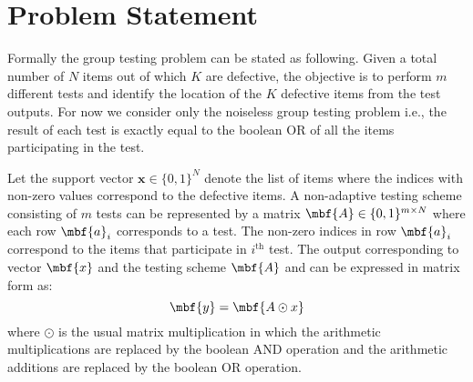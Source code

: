 \documentclass[conference,,twocolumn]{IEEEtran}
\begin{document}

\section{Problem Statement}
Formally the group testing problem can be stated as following. Given a total number of $N$ items out of which $K$ are defective, the objective is to perform $m$ different tests and identify the location of the $K$ defective items from the test outputs. For now we consider only the noiseless group testing problem i.e., the result of each test is exactly equal to the boolean OR of all the items participating in the test. 

Let the support vector $\mathbf{x}\in\{0,1\}^{N}$ denote the list of items where the indices with non-zero values correspond to the defective items. A non-adaptive testing scheme consisting of $m$ tests can be represented by a matrix $\mbf{A}\in\{0,1\}^{m\times N}$ where each row $\mbf{a}_{i}$ corresponds to a test. The non-zero indices in row $\mbf{a}_i$ correspond to the items that participate in $i^{\text{th}}$ test. The output corresponding to vector $\mbf{x}$ and the testing scheme $\mbf{A}$ and can be expressed in matrix form as:
\begin{equation*}
\mbf{y}=\mbf{A\odot x}
\end{equation*}
where $\odot$ is the usual matrix multiplication in which the arithmetic multiplications are replaced by the boolean AND operation and the arithmetic additions are replaced by the boolean OR operation.
\end{document}
